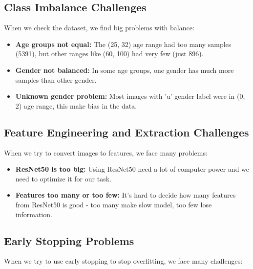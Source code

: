 \documentclass{article}
\begin{document}
\subsection{Class Imbalance Challenges}
When we check the dataset, we find big problems with balance:

\begin{itemize}
    \item \textbf{Age groups not equal:} The (25, 32) age range had too many samples (5391), but other ranges like (60, 100) had very few (just 896).

    \item \textbf{Gender not balanced:} In some age groups, one gender has much more samples than other gender.

    \item \textbf{Unknown gender problem:} Most images with 'u' gender label were in (0, 2) age range, this make bias in the data.
\end{itemize}

\subsection{Feature Engineering and Extraction Challenges}
When we try to convert images to features, we face many problems:

\begin{itemize}
    \item \textbf{ResNet50 is too big:} Using ResNet50 need a lot of computer power and we need to optimize it for our task.

    \item \textbf{Features too many or too few:} It's hard to decide how many features from ResNet50 is good - too many make slow model, too few lose information.
\end{itemize}

\subsection{Early Stopping Problems}
When we try to use early stopping to stop overfitting, we face many challenges:
\end{document}
